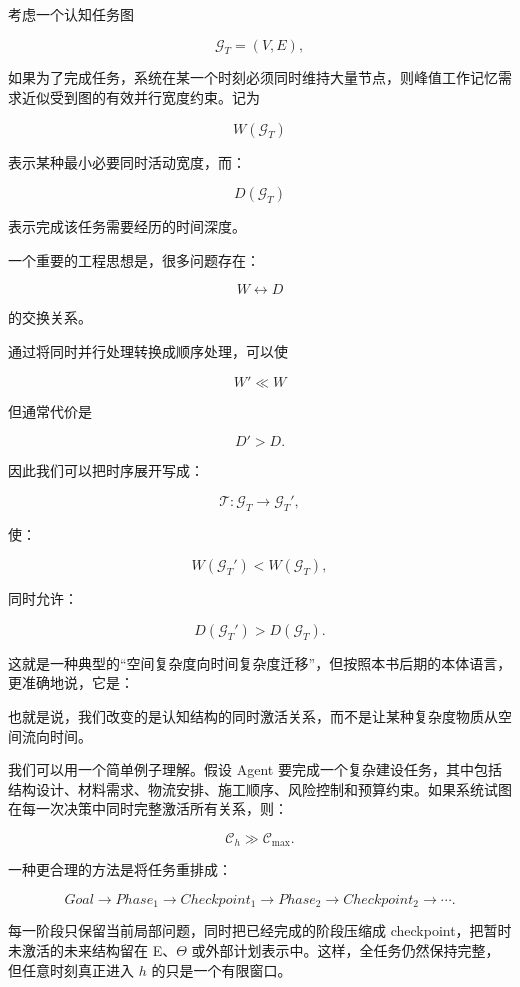 考虑一个认知任务图

\[
\mathcal G_T
=
(V,E),
\]

如果为了完成任务，系统在某一个时刻必须同时维持大量节点，则峰值工作记忆需求近似受到图的有效并行宽度约束。记为

\[
W(\mathcal G_T)
\]

表示某种最小必要同时活动宽度，而：

\[
D(\mathcal G_T)
\]

表示完成该任务需要经历的时间深度。

一个重要的工程思想是，很多问题存在：

\[
W
\leftrightarrow
D
\]

的交换关系。

通过将同时并行处理转换成顺序处理，可以使

\[
W'\ll W
\]

但通常代价是

\[
D'>D.
\]

因此我们可以把时序展开写成：

\[
\mathcal T:
\mathcal G_T
\rightarrow
\mathcal G_T',
\]

使：

\[
W(\mathcal G_T')
<
W(\mathcal G_T),
\]

同时允许：

\[
D(\mathcal G_T')
>
D(\mathcal G_T).
\]

这就是一种典型的“空间复杂度向时间复杂度迁移”，但按照本书后期的本体语言，更准确地说，它是：

\begin{statementbox}
\centering
{}
\end{statementbox}

也就是说，我们改变的是认知结构的同时激活关系，而不是让某种复杂度物质从空间流向时间。

我们可以用一个简单例子理解。假设 Agent 要完成一个复杂建设任务，其中包括结构设计、材料需求、物流安排、施工顺序、风险控制和预算约束。如果系统试图在每一次决策中同时完整激活所有关系，则：

\[
\mathcal C_h
\gg
\mathcal C_{\max}.
\]

一种更合理的方法是将任务重排成：

\[
Goal
\rightarrow
Phase_1
\rightarrow
Checkpoint_1
\rightarrow
Phase_2
\rightarrow
Checkpoint_2
\rightarrow
\cdots.
\]

每一阶段只保留当前局部问题，同时把已经完成的阶段压缩成 checkpoint，把暂时未激活的未来结构留在 E、$\Theta$ 或外部计划表示中。这样，全任务仍然保持完整，但任意时刻真正进入 $h$ 的只是一个有限窗口。

